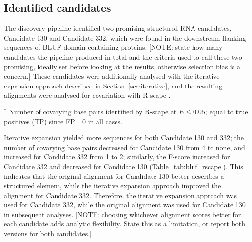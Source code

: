 \subsection{Identified candidates}

The discovery pipeline identified two promising structured RNA candidates, Candidate 130 and Candidate 332, which were found in the downstream flanking sequences of \ac{BLUF} domain-containing proteins. [NOTE: state how many candidates the pipeline produced in total and the criteria used to call these two promising, ideally set before looking at the results, otherwise selection bias is a concern.]
These candidates were additionally analysed with the iterative expansion approach described in Section~\ref{sec:iterative}, and the resulting alignments were analysed for covariation with R-scape \citep{Rivas2020}.

\begin{table}[H]
\centering
\footnotesize
\caption[Covariation analysis for the two BLUF-associated candidates]{\textbf{Covariation analysis for the two BLUF-associated candidates, before and after iterative expansion of the covariance model.}}
\label{tab:bluf_rscape}
    

\par\smallskip
\begin{minipage}{\textwidth}
\raggedright
$^{*}$ Number of covarying base pairs identified by R-scape at $E \le 0.05$; equal to true positives (TP) since FP\,=\,0 in all cases.
\end{minipage}
\end{table}

Iterative expansion yielded more sequences for both Candidate 130 and 332; the number of covarying base pairs decreased for Candidate 130 from 4 to none, and increased for Candidate 332 from 1 to 2; similarly, the F-score increased for Candidate 332 and decreased for Candidate 130 (Table~\ref{tab:bluf_rscape}).
This indicates that the original alignment for Candidate 130 better describes a structured element, while the iterative expansion approach improved the alignment for Candidate 332.
Therefore, the iterative expansion approach was used for Candidate 332, while the original alignment was used for Candidate 130 in subsequent analyses. [NOTE: choosing whichever alignment scores better for each candidate adds analytic flexibility. State this as a limitation, or report both versions for both candidates.]

